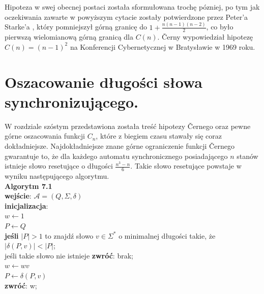 \documentclass[12pt,a4paper]{article}
\begin{document}
Hipoteza w swej obecnej postaci zosta{\l}a sformu{\l}owana troch\k{e} p\'ozniej, po tym jak oczekiwania zawarte w powy\.zszym cytacie zosta{\l}y potwierdzone przez Peter'a Starke'a \cite{5}, kt\'ory pomniejszy{\l} g\'orn\k{a} granic\k{e} do $1+\frac{n(n-1)(n-2)}{2}$, co by{\l}o pierwsz\k{a} wielomianow\k{a} g\'orn\k{a} granic\k{a} dla $C(n)$. \v Cerny wypowiedzia{\l} hipotez\k{e} $C(n)=(n-1)^{2}$ na Konferencji Cybernetycznej  w Bratys{\l}awie w 1969 roku.


\section{Oszacowanie d{\l}ugo\'{s}ci s{\l}owa synchronizuj\k{a}cego.}

W rozdziale sz\'ostym przedstawiona zosta{\l}a tre\'s\'c hipotezy \v Cernego oraz pewne g\'orne oszacowania funkcji $C_{n}$, kt\'ore z  biegiem czasu stawa{\l}y si\k{e} coraz dok{\l}adniejsze. Najdok{\l}adniejsze znane g\'orne ograniczenie funkcji \v Cernego gwarantuje to, \.ze dla ka\.zdego automatu synchronicznego posiadaj\k{a}cego $n$ stan\'ow istnieje s{\l}owo resetuj\k{a}ce o d{\l}ugo\'sci $\frac{n^{3}-n}{6}$. Takie s{\l}owo resetuj\k{a}ce powstaje w wyniku nast\k{e}puj\k{a}cego algorytmu.\\

\textbf{Algorytm 7.1}\\ 
\textbf{wej\'scie}: $\mathscr{A}=(Q, \Sigma, \delta)$\\
\textbf{inicjalizacja}: \\
$w\leftarrow 1$\\ 
$P\leftarrow Q$\\
\textbf{je\'sli} $|P|>1$ to znajd\'z s{\l}owo $v\in\Sigma^{*}$ o minimalnej d{\l}ugo\'sci takie, \.ze $|\delta(P,v)|<|P|$;\\
je\'sli takie s{\l}owo nie istnieje \textbf{zwr\'o\'c}: brak;\\
$w\leftarrow wv$\\ 
$P\leftarrow \delta(P,v)$\\
\textbf{zwr\'o\'c}: w;\\
\end{document}
